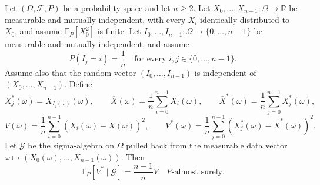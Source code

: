 \begin{theorem}
Let $(\Omega,\mathcal F,P)$ be a probability space and let $n\geq2$. Let
$X_0,\ldots,X_{n-1}:\Omega\to\mathbb R$ be measurable and mutually
independent, with every $X_i$ identically distributed to $X_0$, and assume
$\mathbb E_P[X_0^2]$ is finite. Let
$I_0,\ldots,I_{n-1}:\Omega\to\{0,\ldots,n-1\}$ be measurable and mutually
independent, and assume
\[
 P(I_j=i)=\frac1n
 \quad\text{for every }i,j\in\{0,\ldots,n-1\}.
\]
Assume also that the random vector $(I_0,\ldots,I_{n-1})$ is independent
of $(X_0,\ldots,X_{n-1})$. Define
\[
 X_j^*(\omega)=X_{I_j(\omega)}(\omega),
 \qquad
 \overline X(\omega)=\frac1n\sum_{i=0}^{n-1}X_i(\omega),
 \qquad
 \overline X^*(\omega)=\frac1n\sum_{j=0}^{n-1}X_j^*(\omega),
\]
\[
 V(\omega)=\frac1n\sum_{i=0}^{n-1}
 (X_i(\omega)-\overline X(\omega))^2,
 \qquad
 V^*(\omega)=\frac1n\sum_{j=0}^{n-1}
 (X_j^*(\omega)-\overline X^*(\omega))^2.
\]
Let $\mathcal G$ be the sigma-algebra on $\Omega$ pulled back from the
measurable data vector $\omega\mapsto(X_0(\omega),\ldots,X_{n-1}(\omega))$.
Then
\[
 \mathbb E_P[V^*\mid\mathcal G]
 =\frac{n-1}{n}V
 \quad P\text{-almost surely}.
\]
\end{theorem}

